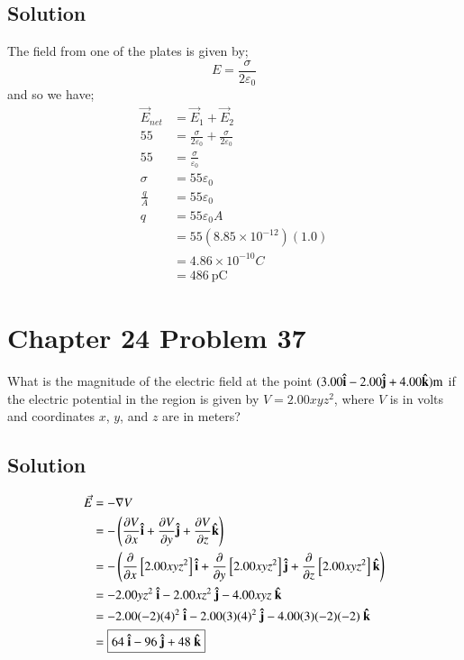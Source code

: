 \documentclass{article}
\newcommand{\m}{\text{m}}
\begin{document}
\subsection*{Solution}
The field from one of the plates is given by;
\[
E = \frac{\sigma}{2\varepsilon_0}
\]
and so we have;
\begin{align*}
    \vec{E}_{net} &= \vec{E}_1 + \vec{E}_2 \\
    55 &= \frac{\sigma}{2\varepsilon_0} + \frac{\sigma}{2\varepsilon_0} \\
    55 &= \frac{\sigma}{\varepsilon_0} \\
    \sigma &= 55 \varepsilon_0 \\
    \frac{q}{A} &= 55 \varepsilon_0 \\
    q &= 55 \varepsilon_0 A \\
    &= 55 (8.85 \times 10^{-12}) (1.0) \\
    &= 4.86 \times 10^{-10} C \\
    &= \boxed{486\ \text{pC}}
\end{align*}

\section*{Chapter 24 Problem 37}
What is the magnitude of the electric field at the point
$(3.00\vu{i} - 2.00\vu{j} + 4.00\vu{k}) \m$ if the electric potential in the region is
given by $V = 2.00xyz^2$, where $V$ is in volts and coordinates $x$, $y$, and
$z$ are in meters?

\subsection*{Solution}
\begin{align*}
    \vec{E} &= -\nabla V \\
    &= -\left(\frac{\partial V}{\partial x} \vu{i} + \frac{\partial V}{\partial y} \vu{j} + \frac{\partial V}{\partial z} \vu{k}\right)\\
    &= -\left(\frac{\partial}{\partial x}\left[2.00xyz^2\right] \vu{i} + \frac{\partial}{\partial y}\left[2.00xyz^2\right] \vu{j} + \frac{\partial}{\partial z}\left[2.00xyz^2\right] \vu{k}\right)\\
    &= -2.00yz^2\ \vu{i} - 2.00xz^2\ \vu{j} - 4.00xyz\ \vu{k} \\
    &= -2.00(-2)(4)^2\ \vu{i} - 2.00(3)(4)^2\ \vu{j} - 4.00(3)(-2)(-2)\ \vu{k} \\
    &= \boxed{64\ \vu{i} - 96\ \vu{j} + 48\ \vu{k}}
\end{align*}
\end{document}
